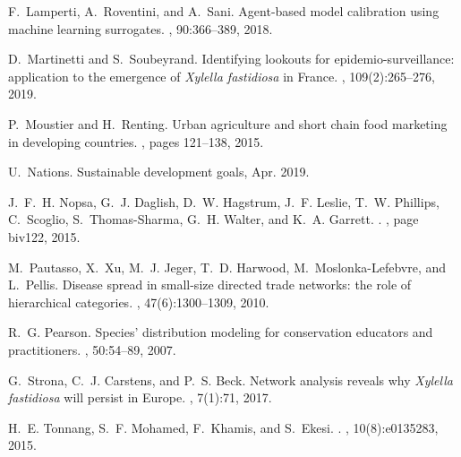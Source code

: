 \documentclass[11pt]{article}
\theoremstyle{definition}
\begin{document}
\begin{thebibliography}{10}
F.~Lamperti, A.~Roventini, and A.~Sani.
\newblock Agent-based model calibration using machine learning surrogates.
, 90:366--389, 2018.

D.~Martinetti and S.~Soubeyrand.
\newblock Identifying lookouts for epidemio-surveillance: application to the
  emergence of \emph{{X}ylella fastidiosa} in {F}rance.
, 109(2):265--276, 2019.

P.~Moustier and H.~Renting.
\newblock Urban agriculture and short chain food marketing in developing
  countries.
, pages 121--138, 2015.

U.~Nations.
\newblock Sustainable development goals, Apr. 2019.

J.~F.~H. Nopsa, G.~J. Daglish, D.~W. Hagstrum, J.~F. Leslie, T.~W. Phillips,
  C.~Scoglio, S.~Thomas-Sharma, G.~H. Walter, and K.~A. Garrett.
.
, page biv122, 2015.

M.~Pautasso, X.~Xu, M.~J. Jeger, T.~D. Harwood, M.~Moslonka-Lefebvre, and
  L.~Pellis.
\newblock Disease spread in small-size directed trade networks: the role of
  hierarchical categories.
, 47(6):1300--1309, 2010.

R.~G. Pearson.
\newblock Species’ distribution modeling for conservation educators and
  practitioners.
, 50:54--89, 2007.

G.~Strona, C.~J. Carstens, and P.~S. Beck.
\newblock Network analysis reveals why \emph{{X}ylella fastidiosa} will persist
  in {E}urope.
, 7(1):71, 2017.

H.~E. Tonnang, S.~F. Mohamed, F.~Khamis, and S.~Ekesi.
.
, 10(8):e0135283, 2015.


\end{thebibliography}
\end{document}
